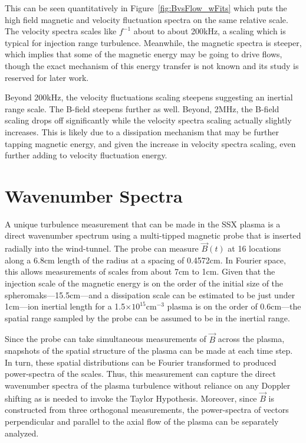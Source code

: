 \documentclass[aip,prl,amsmath,amssymb,reprint,superscriptaddress]{revtex4-1} %
\begin{document}
This can be seen quantitatively in Figure~\ref{fig:BvsFlow_wFits} which puts the high field magnetic and velocity fluctuation spectra on the same relative scale. The velocity spectra scales like $f^{-1}$ about to about 200kHz, a scaling which is typical for injection range turbulence. Meanwhile, the magnetic spectra is steeper, which implies that some of the magnetic energy may be going to drive flows, though the exact mechanism of this energy transfer is not known and its study is reserved for later work.

Beyond 200kHz, the velocity fluctuations scaling steepens suggesting an inertial range scale. The B-field steepens further as well. Beyond, 2MHz, the B-field scaling drops off significantly while the velocity spectra scaling actually slightly increases. This is likely due to a dissipation mechanism that may be further tapping magnetic energy, and given the increase in velocity spectra scaling, even further adding to velocity fluctuation energy.

\section{Wavenumber Spectra}

A unique turbulence measurement that can be made in the SSX plasma is a direct wavenumber spectrum using a multi-tipped magnetic probe that is inserted radially into the wind-tunnel. The probe can measure $\vec{B}(t)$ at 16 locations along a 6.8cm length of the radius at a spacing of 0.4572cm. In Fourier space, this allows measurements of scales from about 7cm to 1cm. Given that the injection scale of the magnetic energy is on the order of the initial size of the spheromaks---15.5cm---and a dissipation scale can be estimated to be just under 1cm---ion inertial length for a 1.5$\times 10^{15}$cm$^{-3}$ plasma is on the order of 0.6cm---the spatial range sampled by the probe can be assumed to be in the inertial range.

Since the probe can take simultaneous measurements of $\vec{B}$ across the plasma, snapshots of the spatial structure of the plasma can be made at each time step. In turn, these spatial distributions can be Fourier transformed to produced power-spectra of the scales. Thus, this measurement can capture the direct wavenumber spectra of the plasma turbulence without reliance on any Doppler shifting as is needed to invoke the Taylor Hypothesis. Moreover, since $\vec{B}$ is constructed from three orthogonal measurements, the power-spectra of vectors perpendicular and parallel to the axial flow of the plasma can be separately analyzed. 
\end{document}

